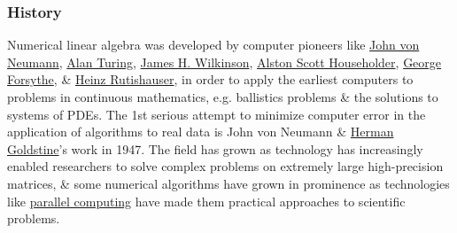 \documentclass{article}
\begin{document}
\subsubsection{History}
Numerical linear algebra was developed by computer pioneers like \href{https://en.wikipedia.org/wiki/John_von_Neumann}{\sc John von Neumann}, \href{https://en.wikipedia.org/wiki/Alan_Turing}{\sc Alan Turing}, \href{https://en.wikipedia.org/wiki/James_H._Wilkinson}{\sc James H. Wilkinson}, \href{https://en.wikipedia.org/wiki/Alston_Scott_Householder}{\sc Alston Scott Householder}, \href{https://en.wikipedia.org/wiki/George_Forsythe}{\sc George Forsythe}, \& \href{https://en.wikipedia.org/wiki/Heinz_Rutishauser}{Heinz Rutishauser}, in order to apply the earliest computers to problems in continuous mathematics, e.g. ballistics problems \& the solutions to systems of PDEs. The 1st serious attempt to minimize computer error in the application of algorithms to real data is {\sc John von Neumann} \& \href{https://en.wikipedia.org/wiki/Herman_Goldstine}{\sc Herman Goldstine}'s work in 1947. The field has grown as technology has increasingly enabled researchers to solve complex problems on extremely large high-precision matrices, \& some numerical algorithms have grown in prominence as technologies like \href{https://en.wikipedia.org/wiki/Parallel_computing}{parallel computing} have made them practical approaches to scientific problems.
\end{document}
